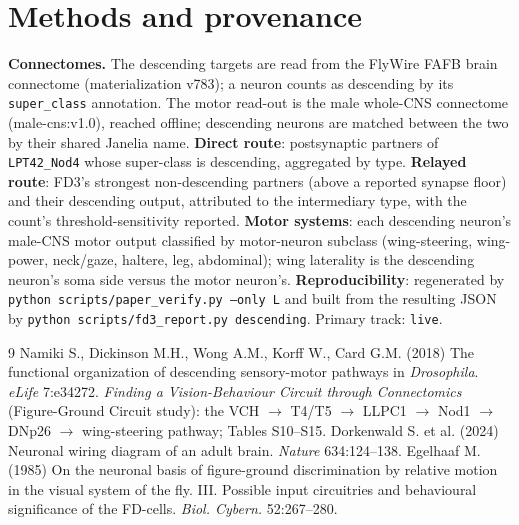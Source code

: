 \documentclass[11pt]{article}
\newcommand{\ttt}[1]{\texttt{#1}}
\begin{document}
\section{Methods and provenance}

\textbf{Connectomes.} The descending targets are read from the FlyWire FAFB brain connectome (materialization v783); a neuron counts as descending by its \ttt{super\_class} annotation. The motor read-out is the male whole-CNS connectome (male-cns:v1.0), reached offline; descending neurons are matched between the two by their shared Janelia name. \textbf{Direct route}: postsynaptic partners of \ttt{LPT42\_Nod4} whose super-class is descending, aggregated by type. \textbf{Relayed route}: FD3's strongest non-descending partners (above a reported synapse floor) and their descending output, attributed to the intermediary type, with the count's threshold-sensitivity reported. \textbf{Motor systems}: each descending neuron's male-CNS motor output classified by motor-neuron subclass (wing-steering, wing-power, neck/gaze, haltere, leg, abdominal); wing laterality is the descending neuron's soma side versus the motor neuron's. \textbf{Reproducibility}: regenerated by \ttt{python scripts/paper\_verify.py --only L} and built from the resulting JSON by \ttt{python scripts/fd3\_report.py descending}. Primary track: \ttt{live}.

\begin{thebibliography}{9}
 Namiki S., Dickinson M.H., Wong A.M., Korff W., Card G.M. (2018) The functional organization of descending sensory-motor pathways in \textit{Drosophila}. \textit{eLife} 7:e34272.
 \textit{Finding a Vision-Behaviour Circuit through Connectomics} (Figure-Ground Circuit study): the VCH $\to$ T4/T5 $\to$ LLPC1 $\to$ Nod1 $\to$ DNp26 $\to$ wing-steering pathway; Tables S10--S15.
 Dorkenwald S. et al. (2024) Neuronal wiring diagram of an adult brain. \textit{Nature} 634:124--138.
 Egelhaaf M. (1985) On the neuronal basis of figure-ground discrimination by relative motion in the visual system of the fly. III. Possible input circuitries and behavioural significance of the FD-cells. \textit{Biol. Cybern.} 52:267--280.
\end{thebibliography}
\end{document}
